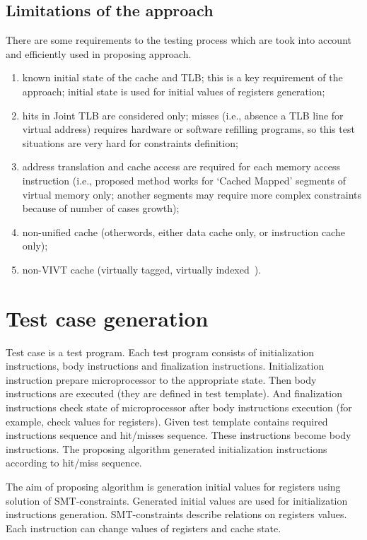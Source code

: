\documentclass[times, 10pt,twocolumn]{article}
\begin{document}
\subsection{Limitations of the approach}
There are some requirements to the testing process which are took
into account and efficiently used in proposing approach.
\begin{enumerate}
\item known initial state of the cache and TLB; this is a key
requirement of the approach; initial state is used for initial
values of registers generation;
\item hits in Joint TLB are considered only; misses (i.e., absence a
TLB line for virtual address) requires hardware or software
refilling programs, so this test situations are very hard for
constraints definition;
\item address translation and cache access are required for each
memory access instruction (i.e., proposed method works for `Cached
Mapped' segments of virtual memory only; another segments may
require more complex constraints because of number of cases growth);
\item non-unified cache (otherwords, either data cache only, or
instruction cache only);
\item non-VIVT cache (virtually tagged, virtually indexed~\cite{memory_systems}).
\end{enumerate}

\section{Test case generation}

Test case is a test program. Each test program consists of
initialization instructions, body instructions and finalization
instructions. Initialization instruction prepare microprocessor to
the appropriate state. Then body instructions are executed (they are
defined in test template). And finalization instructions check state
of microprocessor after body instructions execution (for example,
check values for registers). Given test template contains required
instructions sequence and hit/misses sequence. These instructions
become body instructions. The proposing algorithm generated
initialization instructions according to hit/miss sequence.

The aim of proposing algorithm is generation initial values for
registers using solution of SMT-constraints. Generated initial
values are used for initialization instructions generation.
SMT-constraints describe relations on registers values. Each
instruction can change values of registers and cache
state.
\end{document}
